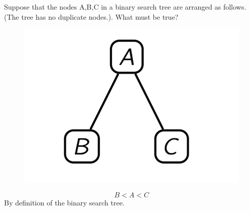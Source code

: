 \documentclass [12pt]{article}
\begin{document}
\section{} Suppose that the nodes A,B,C in a binary search tree are arranged as follows. (The tree has no duplicate nodes.). What must be true?
\begin{figure}[H]
    \centering
    \includegraphics[scale=0.5]{pic1.png} 
    \label{fig:my_label}
\end{figure}

\begin{Solution}
$$B < A < C$$
By definition of the binary search tree.
\end{Solution}
\end{document}
